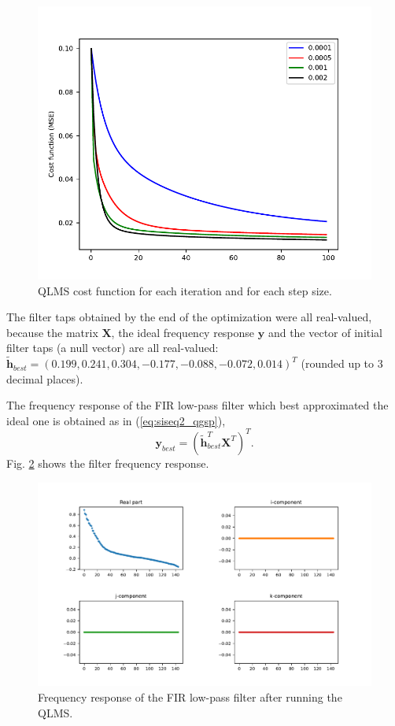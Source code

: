 \begin{figure}
\centering
\includegraphics[width=0.65\linewidth]{thesis/Figures/uk_example/uk_qlms_iterations.pdf}
\caption{QLMS cost function for each iteration and for each step size.}
\label{fig:uk_qlms_iterations}
\end{figure}

The filter taps obtained by the end of the optimization were all real-valued, because the matrix $\mathbf{X}$, the ideal frequency response $\mathbf{y}$ and the vector of initial filter taps (a null vector) are all real-valued: $\mathbf{\widetilde{h}}_{best} = (
0.199, 0.241, 0.304, -0.177, -0.088, -0.072, 0.014
)^T$ (rounded up to 3 decimal places).

The frequency response of the FIR low-pass filter which best approximated the ideal one is obtained as in (\ref{eq:siseq2_qgsp}),
\begin{equation}
\mathbf{y}_{best} = \left(
\mathbf{\widetilde{h}}_{best}^T \mathbf{X}^T
\right)^T.
\end{equation}
Fig. \ref{fig:uk_qlm_filter} shows the filter frequency response.

\begin{figure}
\centering
\includegraphics[width=\linewidth]{thesis/Figures/uk_example/uk_qlm_filter.pdf}
\caption{Frequency response of the FIR low-pass filter after running the QLMS.}
\label{fig:uk_qlm_filter}
\end{figure}

